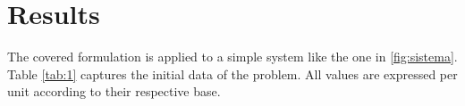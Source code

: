 \documentclass[conference]{IEEEtran}
\begin{document}

\section{Results}\label{resultats}
The covered formulation is applied to a simple system like the one in \ref{fig:sistema}. Table \ref{tab:1} captures the initial data of the problem. All values are expressed per unit according to their respective base.
\end{document}
